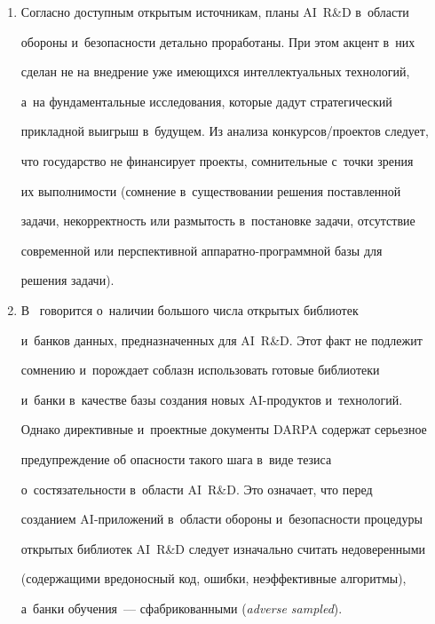 \begin{enumerate}[1.]
{8-bor, 9-bor, 10-bor, 11-bor}, согласованно разработанных с~основным


документом~\cite{4-bor}.


\item %


Согласно доступным открытым источникам, планы AI~R\&D в~области


обороны и~безопас\-ности детально проработаны. При этом акцент в~них


сделан не на внед\-ре\-ние уже имеющихся интеллектуальных технологий,


а~на фундаментальные исследования, которые дадут стратегический


прикладной выигрыш в~будущем. Из анализа кон\-кур\-сов\!/\!про\-ек\-тов следует,


что государство не финансирует проекты, сомнительные с~точки зрения


их выполнимости (сомнение в~существовании решения поставленной


задачи, некорректность или размытость в~постановке задачи, отсутствие


современной или перспективной ап\-па\-рат\-но-про\-грам\-мной базы для


решения задачи).


\item %


В~\cite{3-bor} говорится о~наличии большого числа открытых библиотек


и~банков данных, предназначенных для AI~R\&D. Этот факт не подлежит


сомнению и~порождает соблазн использовать готовые биб\-лио\-те\-ки


и~банки в~качестве базы создания новых AI-про\-дук\-тов и~технологий.


Однако директивные и~проектные документы DARPA содержат серьезное


предупреждение об опас\-ности такого шага в~виде тезиса


о~состязательности в~области AI~R\&D. Это означает, что перед


созданием AI-при\-ло\-же\-ний в~об\-ласти обороны и~безопас\-ности процедуры


открытых библиотек AI~R\&D следует изначально считать недоверенными


(содержащими вредоносный код, ошибки, неэффективные алгоритмы),


а~банки обуче\-ния~--- сфабрикованными (\textit{adverse sampled}).


  \end{enumerate}





